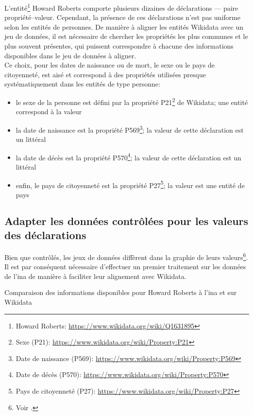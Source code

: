 L'entité\footnote{Howard Roberts: \url{https://www.wikidata.org/wiki/Q1631895}} Howard Roberts comporte plusieurs dizaines de déclarations --- paire propriété--valeur. Cependant, la présence de ces déclarations n'est pas uniforme selon les entités de personnes. De manière à aligner les entités Wikidata avec un jeu de données, il est nécessaire de chercher les propriétés les plus communes et le plus souvent présentes, qui puissent correspondre à chacune des informations disponibles dans le jeu de données à aligner.\\

Ce choix, pour les dates de naissance ou de mort, le sexe ou le pays de citoyenneté, est aisé et correspond à des propriétés utilisées presque systématiquement dans les entités de type personne:
\begin{itemize}
	\item le sexe de la personne est défini par la propriété P21\footnote{Sexe (P21): \url{https://www.wikidata.org/wiki/Property:P21}} de Wikidata; une entité correspond à la valeur
	\item la date de naissance est la propriété P569\footnote{Date de naissance (P569): \url{https://www.wikidata.org/wiki/Property:P569}}; la valeur de cette déclaration est un littéral
	\item la date de décès est la propriété P570\footnote{Date de décès (P570): \url{https://www.wikidata.org/wiki/Property:P570}}; la valeur de cette déclaration est un littéral
	\item enfin, le pays de citoyenneté est la propriété P27\footnote{Pays de citoyenneté (P27): \url{https://www.wikidata.org/wiki/Property:P27}}; la valeur est une entité de pays
\end{itemize} 

\subsection{\label{II-C-2-b} Adapter les données contrôlées pour les valeurs des déclarations}

Bien que contrôlés, les jeux de données diffèrent dans la graphie de leurs valeurs\footnote{Voir .}. Il est par conséquent nécessaire d'effectuer un premier traitement sur les données de l'\ac{ina} de manière à faciliter leur alignement avec Wikidata.
\begin{table}[!h]
	\centering
	\caption{Comparaison des informations disponibles pour Howard Roberts à l'\ac{ina} et sur Wikidata}
	\label{table_roberts_2}
\end{table}

